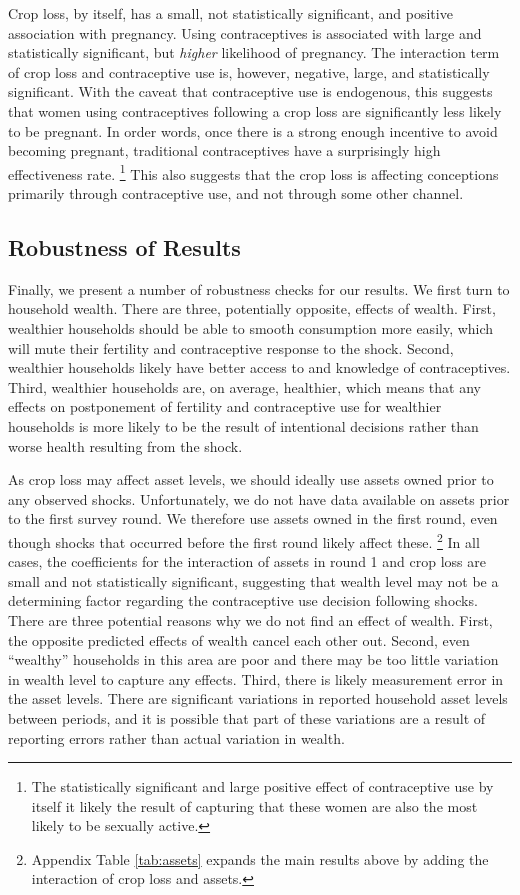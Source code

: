 \documentclass[letterpaper,12pt]{article}
\begin{document}
Crop loss, by itself, has a small, not statistically significant,
and positive association with pregnancy.
Using contraceptives is associated with large and statistically 
significant, but \emph{higher} likelihood of pregnancy.
The interaction term of crop loss and contraceptive use is,
however, negative, large, and statistically significant. 
With the caveat that contraceptive use is endogenous, this suggests
that women using contraceptives following a crop loss are significantly 
less likely to be pregnant. 
In order words, once there is a strong enough incentive to avoid
becoming pregnant, traditional contraceptives have a surprisingly high
effectiveness rate.%
\footnote{
The statistically significant and large positive effect of 
contraceptive use by itself it likely the result of capturing
that these women are also the most likely to be sexually active.
}
This also suggests that the crop loss is affecting conceptions primarily 
through contraceptive use, and not through some other channel. 



\subsection{Robustness of Results}

Finally, we present a number of robustness checks for our results.
We first turn to household wealth.
There are three, potentially opposite, effects of wealth.
First,
wealthier households should be able to smooth consumption more easily,
which will mute their fertility and contraceptive response to the shock.
Second, 
wealthier households likely have better access to and knowledge
of contraceptives.
Third, 
wealthier households are, on average, healthier, which means that any 
effects on postponement of fertility and contraceptive use for wealthier
households is more likely to be the result of intentional decisions 
rather than worse health resulting from the shock.

As crop loss may affect asset levels, we should ideally use assets owned 
prior to any observed shocks.
Unfortunately, we do not have data available on assets prior to the first 
survey round.
We therefore use assets owned in the first round, even though 
shocks that occurred before the first round likely affect these.%
\footnote{
Appendix Table \ref{tab:assets} expands the main results above by adding 
the interaction of crop loss and assets.
}
In all cases, the coefficients for the interaction of assets in round 1 and 
crop loss are small and not statistically significant,
suggesting that wealth level may not be a determining
factor regarding the contraceptive use decision following shocks. 
There are three potential reasons why we do not find an effect of wealth.
First, the opposite predicted effects of wealth cancel each other out.
Second, even ``wealthy'' households in this area are  poor and
there may be too little variation in wealth level to capture any effects.
Third, there is likely measurement error in the asset levels. 
There are significant variations in reported household asset levels between 
periods, and it is possible that part of these variations are a result of 
reporting errors rather than actual variation in wealth.
\end{document}
